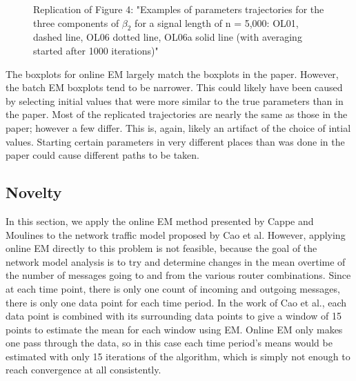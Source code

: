 \documentclass[12pt]{article}
\begin{document}
\begin{figure}[h!]
\begin{subfigure}[t]{.6\textwidth}
\end{subfigure}
\caption{Replication of Figure 4: "Examples of parameters trajectories for the three components of $\beta_{2}$ for a signal length of n = 5,000: OL01, dashed line, OL06 dotted line, OL06a solid line (with averaging started after 1000 iterations)"} \label{f2}
\end{figure}

\clearpage
The boxplots for online EM largely match the boxplots in the paper. However, the batch EM boxplots tend to be narrower. This could likely have been caused by selecting initial values that were more similar to the true parameters than in the paper. Most of the replicated trajectories are nearly the same as those in the paper; however a few differ. This is, again, likely an artifact of the choice of intial values. Starting certain parameters in very different places than was done in the paper could cause different paths to be taken.  



\subsection{Novelty}
In this section, we apply the online EM method presented by Cappe and Moulines to the network traffic model proposed by Cao et al. However, applying online EM directly to this problem is not feasible, because the goal of the network model analysis is to try and determine changes in the mean overtime of  the number of messages going to and from the various router combinations.  Since at each time point, there is only one count of incoming and outgoing messages, there is only one data point for each time period. In the work of Cao et al., each data point is combined with its surrounding data points to give a window of 15 points to estimate the mean for each window using EM. Online EM only makes one pass through the data, so in this case each time period's means would be estimated with only 15 iterations of the algorithm, which is simply not enough to reach convergence at all consistently.\\
\end{document}
